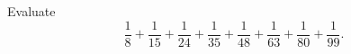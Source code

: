 Evaluate
\[\dfrac{1}{8}+\dfrac{1}{15}+\dfrac{1}{24}+\dfrac{1}{35}+\dfrac{1}{48}+\dfrac{1}{63}+\dfrac{1}{80}+\dfrac{1}{99}.\]
